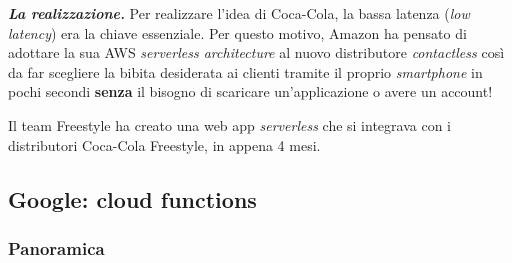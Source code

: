 \documentclass[a4paper]{article}
\begin{document}
	\noindent
	\textbf{\emph{La realizzazione.}} Per realizzare l'idea di Coca-Cola, la bassa latenza (\emph{low latency}) era la chiave essenziale. Per questo motivo, Amazon ha pensato di adottare la sua AWS \emph{serverless architecture} al nuovo distributore \emph{contactless} così da far scegliere la bibita desiderata ai clienti tramite il proprio \emph{smartphone} in pochi secondi \textbf{senza} il bisogno di scaricare un'applicazione o avere un account!
	
	Il team Freestyle ha creato una web app \emph{serverless} che si integrava con i distributori Coca-Cola Freestyle, in appena 4 mesi.\newpage
	
	\subsection{Google: cloud functions}
	
	\subsubsection{Panoramica}
	
\end{document}
